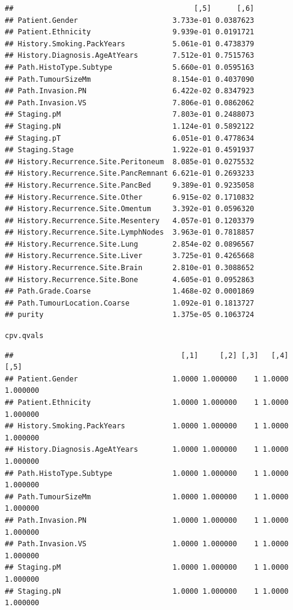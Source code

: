 \documentclass{article}\usepackage[]{graphicx}\usepackage[]{color}
\makeatletter
\newcommand{\hlstd}[1]{\textcolor[rgb]{0.345,0.345,0.345}{#1}}%
\newenvironment{kframe}{%
 \def\at@end@of@kframe{}%
 \ifinner\ifhmode%
  \def\at@end@of@kframe{\end{minipage}}%
  \begin{minipage}{\columnwidth}%
 \fi\fi%
 \def\FrameCommand##1{\hskip\@totalleftmargin \hskip-\fboxsep
 \colorbox{shadecolor}{##1}\hskip-\fboxsep
     \hskip-\linewidth \hskip-\@totalleftmargin \hskip\columnwidth}%
 \MakeFramed {\advance\hsize-\width
   \@totalleftmargin\z@ \linewidth\hsize
   \@setminipage}}%
 {\par\unskip\endMakeFramed%
 \at@end@of@kframe}
\newenvironment{knitrout}{}{} %
\makeatother
\begin{document}
\begin{knitrout}
\begin{kframe}
\begin{verbatim}
##                                          [,5]      [,6]
## Patient.Gender                      3.733e-01 0.0387623
## Patient.Ethnicity                   9.939e-01 0.0191721
## History.Smoking.PackYears           5.061e-01 0.4738379
## History.Diagnosis.AgeAtYears        7.512e-01 0.7515763
## Path.HistoType.Subtype              5.660e-01 0.0595163
## Path.TumourSizeMm                   8.154e-01 0.4037090
## Path.Invasion.PN                    6.422e-02 0.8347923
## Path.Invasion.VS                    7.806e-01 0.0862062
## Staging.pM                          7.803e-01 0.2488073
## Staging.pN                          1.124e-01 0.5892122
## Staging.pT                          6.051e-01 0.4778634
## Staging.Stage                       1.922e-01 0.4591937
## History.Recurrence.Site.Peritoneum  8.085e-01 0.0275532
## History.Recurrence.Site.PancRemnant 6.621e-01 0.2693233
## History.Recurrence.Site.PancBed     9.389e-01 0.9235058
## History.Recurrence.Site.Other       6.915e-02 0.1710832
## History.Recurrence.Site.Omentum     3.392e-01 0.0596320
## History.Recurrence.Site.Mesentery   4.057e-01 0.1203379
## History.Recurrence.Site.LymphNodes  3.963e-01 0.7818857
## History.Recurrence.Site.Lung        2.854e-02 0.0896567
## History.Recurrence.Site.Liver       3.725e-01 0.4265668
## History.Recurrence.Site.Brain       2.810e-01 0.3088652
## History.Recurrence.Site.Bone        4.605e-01 0.0952863
## Path.Grade.Coarse                   1.468e-02 0.0001869
## Path.TumourLocation.Coarse          1.092e-01 0.1813727
## purity                              1.375e-05 0.1063724
\end{verbatim}
\begin{alltt}
\hlstd{cpv.qvals}
\end{alltt}
\begin{verbatim}
##                                       [,1]     [,2] [,3]   [,4]     [,5]
## Patient.Gender                      1.0000 1.000000    1 1.0000 1.000000
## Patient.Ethnicity                   1.0000 1.000000    1 1.0000 1.000000
## History.Smoking.PackYears           1.0000 1.000000    1 1.0000 1.000000
## History.Diagnosis.AgeAtYears        1.0000 1.000000    1 1.0000 1.000000
## Path.HistoType.Subtype              1.0000 1.000000    1 1.0000 1.000000
## Path.TumourSizeMm                   1.0000 1.000000    1 1.0000 1.000000
## Path.Invasion.PN                    1.0000 1.000000    1 1.0000 1.000000
## Path.Invasion.VS                    1.0000 1.000000    1 1.0000 1.000000
## Staging.pM                          1.0000 1.000000    1 1.0000 1.000000
## Staging.pN                          1.0000 1.000000    1 1.0000 1.000000

\end{verbatim}
\end{kframe}
\end{knitrout}
\end{document}
